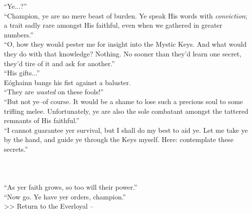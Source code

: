 “Ye...?”\\

“Champion, ye are no mere beast of burden. Ye speak His words with \emph{conviction}; a trait sadly rare amongst His faithful, even when we gathered in greater numbers.”\\

“O, how they would pester me for insight into the Mystic Keys. And what would they do with that knowledge? Nothing. No sooner than they’d learn one secret, they’d tire of it and ask for another.”\\

“His gifts...”\\

Eóghainn bangs his fist against a baluster.\\
“They are \emph{wasted} on these fools!”\\

“But not ye--of course. It would be a shame to lose such a precious soul to some trifling melee. Unfortunately, ye are also the sole combatant amongst the tattered remnants of His faithful.”\\

“I cannot guarantee yer survival, but I shall do my best to aid ye. Let me take ye by the hand, and guide ye through the Keys myself. Here: contemplate these secrets.”\\
\\
\\
\\

“As yer faith grows, so too will their power.”\\

“Now go. Ye have yer orders, champion.”\\

>> Return to the Everloyal -- 